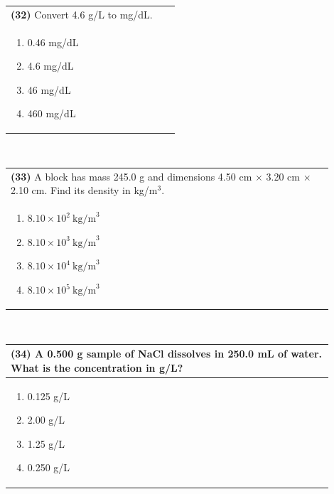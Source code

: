 \documentclass{article}
\begin{document}
\vspace{0.5cm}
\noindent \begin{tabular}{|p{0.9\linewidth}|}
\hline
\vspace{0.2cm}
\textbf{(32)} Convert 4.6 g/L to mg/dL.\\
\begin{minipage}[t]{0.85\linewidth}
\begin{enumerate}[label=\alph*.]
   \item 0.46 mg/dL
   \item 4.6 mg/dL
   \item 46 mg/dL
   \item 460 mg/dL
\end{enumerate}
\end{minipage}\\
\hline
\end{tabular}
\\

\vspace{0.5cm}
\noindent \begin{tabular}{|p{0.9\linewidth}|}
\hline
\vspace{0.2cm}
\textbf{(33)} A block has mass 245.0 g and dimensions 4.50 cm $\times$ 3.20 cm $\times$ 2.10 cm. Find its density in kg/m$^3$.\\
\begin{minipage}[t]{0.85\linewidth}
\begin{enumerate}[label=\alph*.]
   \item $8.10\times10^{2}~\text{kg/m}^3$
   \item $8.10\times10^{3}~\text{kg/m}^3$
   \item $8.10\times10^{4}~\text{kg/m}^3$
   \item $8.10\times10^{5}~\text{kg/m}^3$
\end{enumerate}
\end{minipage}\\
\hline
\end{tabular}
\\

 \newpage 
\noindent \begin{tabular}{|p{0.9\linewidth}|}
\hline
\vspace{0.2cm}
\textbf{(34)} A 0.500 g sample of NaCl dissolves in 250.0 mL of water. What is the concentration in g/L?\\
\hline
\vspace{0.2cm}
\begin{minipage}[t]{0.85\linewidth}
\begin{enumerate}[label=\alph*.]
\item 0.125 g/L
\item 2.00 g/L
\item 1.25 g/L
\item 0.250 g/L
\end{enumerate}
\end{minipage} \\
\hline
\end{tabular}
\\
\end{document}

